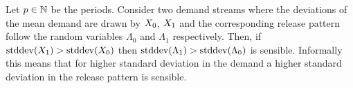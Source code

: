 \documentclass[mnsc]{informs3}
\newcommand\MS[2][r]{\ifx t#1 \textcolor{blue}{[\textbf{MS:} #2]}
  \else \begin{center}\textcolor{blue}{\textbf{MS:} #2} \end{center} \fi}
\begin{document}

\begin{lemma}




  Let $p \in \mathbb{N}$ be the periods. Consider two demand streams where the deviations of the mean
  demand are drawn by $X_{0}$, $X_{1}$ and the corresponding release pattern follow the random
  variables $\Lambda_{0}$ and $\Lambda_{1}$ respectively.
  Then, if $\mathrm{stddev}(X_{1}) > \mathrm{stddev}(X_{0})$  then $\mathrm{stddev}(\Lambda_{1}) > \mathrm{stddev}(\Lambda_{0})$
  is sensible.
  Informally this means that for higher standard deviation in the demand a higher standard deviation
  in the release pattern is sensible.



\end{lemma}
\end{document}
